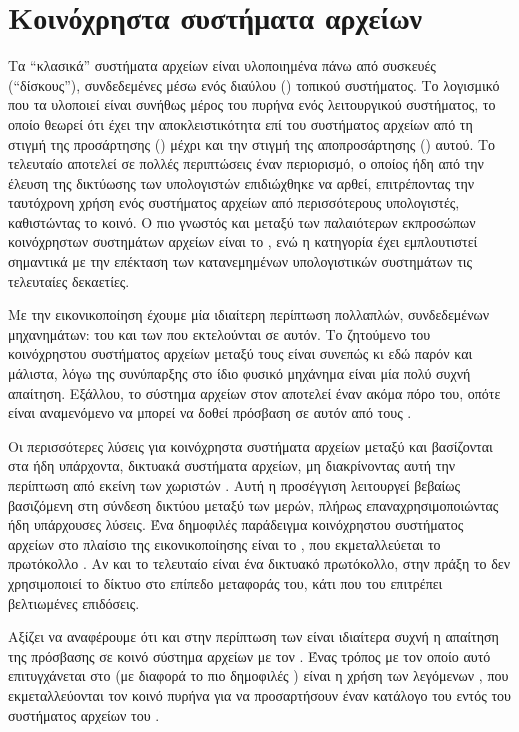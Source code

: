 \section{Κοινόχρηστα συστήματα αρχείων}
Τα ``κλασικά'' συστήματα αρχείων είναι υλοποιημένα πάνω από συσκευές 
(``δίσκους''), συνδεδεμένες μέσω ενός διαύλου () τοπικού συστήματος.
Το λογισμικό που τα υλοποιεί είναι συνήθως μέρος του πυρήνα ενός λειτουργικού
συστήματος, το οποίο θεωρεί ότι έχει την αποκλειστικότητα επί του συστήματος
αρχείων από τη στιγμή της προσάρτησης () μέχρι και την στιγμή της
αποπροσάρτησης () αυτού. Το τελευταίο αποτελεί σε πολλές περιπτώσεις
έναν περιορισμό, ο οποίος ήδη από την έλευση της δικτύωσης των υπολογιστών
επιδιώχθηκε να αρθεί, επιτρέποντας την ταυτόχρονη χρήση ενός συστήματος αρχείων
από περισσότερους υπολογιστές, καθιστώντας το κοινό. Ο πιο γνωστός και μεταξύ
των παλαιότερων εκπροσώπων κοινόχρηστων συστημάτων αρχείων είναι το  \cite{nfs},
ενώ η κατηγορία έχει εμπλουτιστεί σημαντικά με την επέκταση των κατανεμημένων
υπολογιστικών συστημάτων τις τελευταίες δεκαετίες.

Με την εικονικοποίηση έχουμε μία ιδιαίτερη περίπτωση πολλαπλών, συνδεδεμένων
μηχανημάτων: του \host{} και των  που εκτελούνται σε αυτόν.
Το ζητούμενο του κοινόχρηστου συστήματος αρχείων μεταξύ τους είναι συνεπώς κι
εδώ παρόν και μάλιστα, λόγω της συνύπαρξης στο ίδιο φυσικό μηχάνημα είναι μία
πολύ συχνή απαίτηση. Εξάλλου, το σύστημα αρχείων στον \host{} αποτελεί έναν
ακόμα πόρο του, οπότε είναι αναμενόμενο να μπορεί να δοθεί πρόσβαση σε αυτόν από
τους .

Οι περισσότερες λύσεις για κοινόχρηστα συστήματα αρχείων μεταξύ \host{} και
\guest{} βασίζονται στα ήδη υπάρχοντα, δικτυακά συστήματα αρχείων, μη
διακρίνοντας αυτή την περίπτωση από εκείνη των χωριστών . Αυτή η
προσέγγιση λειτουργεί βεβαίως βασιζόμενη στη σύνδεση δικτύου μεταξύ των μερών,
πλήρως επαναχρησιμοποιώντας ήδη υπάρχουσες λύσεις. Ένα δημοφιλές παράδειγμα
κοινόχρηστου συστήματος αρχείων στο πλαίσιο της εικονικοποίησης είναι το
 \cite{virtfs}, που εκμεταλλεύεται το πρωτόκολλο  \cite{9p}.
Αν και το τελευταίο είναι ένα δικτυακό πρωτόκολλο, στην πράξη το 
δεν χρησιμοποιεί το δίκτυο στο επίπεδο μεταφοράς του, κάτι που του επιτρέπει
βελτιωμένες επιδόσεις.

Αξίζει να αναφέρουμε ότι και στην περίπτωση των  είναι ιδιαίτερα
συχνή η απαίτηση της πρόσβασης σε κοινό σύστημα αρχείων με τον \host{}. Ένας
τρόπος με τον οποίο αυτό επιτυγχάνεται στο  \cite{docker}
(με διαφορά το πιο δημοφιλές ) είναι η χρήση των λεγόμενων
 \cite{docker:bind-mounts},
που εκμεταλλεύονται τον κοινό πυρήνα για να προσαρτήσουν έναν κατάλογο του
\host{} εντός του συστήματος αρχείων του .

